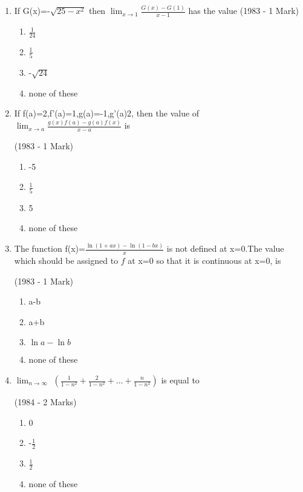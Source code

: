 \documentclass[journal,12pt,twocolumn]{IEEEtran}
\theoremstyle{remark}
\begin{document}
\begin{enumerate}[start=2]
\item If G(x)=-$\sqrt{25-x^2}$ then $\lim_{x \to 1}\frac{G(x)-G(1)}{x-1}$ has the value
\hfill    (1983 - 1 Mark)
\begin{enumerate}
    \item $\frac{1}{24}$
    \item $\frac{1}{5}$
    \item -$\sqrt{24}$
    \item none of these
    
\end{enumerate}

\item If f(a)=2,f'(a)=1,g(a)=-1,g'(a)2, then the value of $\lim_{x\to a}\frac{g(x)f(a)-g(a)f(x)}{x-a}$ is

  \hfill (1983 - 1 Mark)
     \begin{enumerate}
         \item -5
         \item $\frac{1}{5}$
         \item 5
         \item none of these
     \end{enumerate}

\item The function f(x)=$\frac{\ln{(1+ax)}-\ln{(1-bx)}}{x}$ is not defined at x=0.The value which should be assigned to $f$ at x=0 so that it is continuous at x=0, is

  \hfill              (1983 - 1 Mark)
    \begin{enumerate}
        \item a-b
        \item a+b
        \item $\ln{a}-\ln{b}$
        \item none of these
        
    \end{enumerate}

\item $\lim_{n\to \infty}$
      $\left(
      \frac{1}{1-n^2} + \frac{2}{1-n^2} +...+ \frac{n}{1-n^2}
       \right)$ is equal to
       
             \hfill(1984 - 2 Marks)
                 \begin{enumerate}
                    \item 0
                    \item -$\frac{1}{2}$
                    \item $\frac{1}{2}$
                    \item none of these
             

\end{enumerate}
\end{enumerate}
\end{document}
